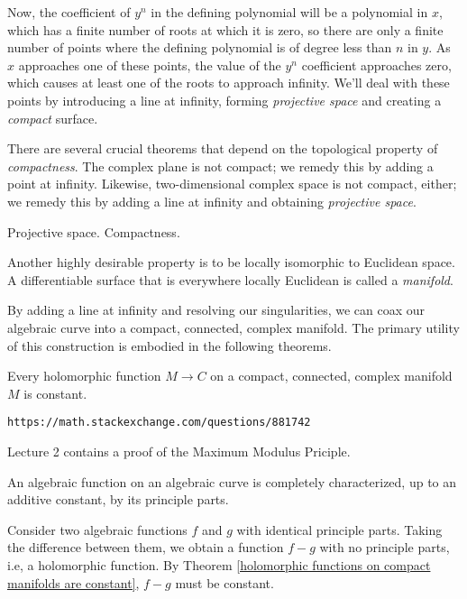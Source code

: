 Now, the coefficient of $y^n$ in the defining polynomial will be a
polynomial in $x$, which has a finite number of roots at which it is
zero, so there are only a finite number of points where the defining
polynomial is of degree less than $n$ in $y$.  As $x$ approaches one
of these points, the value of the $y^n$ coefficient approaches zero,
which causes at least one of the roots to approach infinity.  We'll
deal with these points by introducing a line at infinity, forming
{\it projective space} and creating a {\it compact} surface.

There are several crucial theorems that depend on the topological
property of {\it compactness}.  The complex plane is not compact; we
remedy this by adding a point at infinity.  Likewise, two-dimensional
complex space is not compact, either; we remedy this by adding a
line at infinity and obtaining {\it projective space}.

Projective space.  Compactness.

Another highly desirable property is to be locally isomorphic to
Euclidean space.  A differentiable surface that is everywhere locally
Euclidean is called a {\it manifold}.

By adding a line at infinity and resolving our singularities, we can
coax our algebraic curve into a compact, connected, complex manifold.
The primary utility of this construction is embodied in the following
theorems.

\theorem
\label{holomorphic functions on compact manifolds are constant}

Every holomorphic function $M \to C$ on a compact, connected, complex manifold $M$ is constant.

\proof

{\tt https://math.stackexchange.com/questions/881742}

\cite{guillemin} Lecture 2 contains a proof of the Maximum Modulus Priciple.

\endtheorem

\theorem
\label{algebraic functions are characterized by their principle parts}

An algebraic function on an algebraic curve is completely characterized, up to an additive
constant, by its principle parts.

\proof

Consider two algebraic functions $f$ and $g$ with identical principle
parts.  Taking the difference between them, we obtain a function $f-g$
with no principle parts, i.e, a holomorphic function.  By
Theorem \ref{holomorphic functions on compact manifolds are constant},
$f-g$ must be constant.

